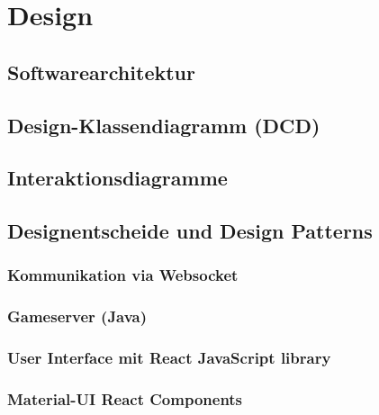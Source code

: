\documentclass[11pt,ngerman]{article}
\begin{document}


    \section{Design}

    \subsection{Softwarearchitektur}

    \subsection{Design-Klassendiagramm (DCD)}

    \subsection{Interaktionsdiagramme}

    \subsection{Designentscheide und Design Patterns}

    \subsubsection{Kommunikation via Websocket}

    \subsubsection{Gameserver  (Java)}

    \subsubsection{User Interface mit React JavaScript library}

    \subsubsection{Material-UI React Components}



\end{document}
